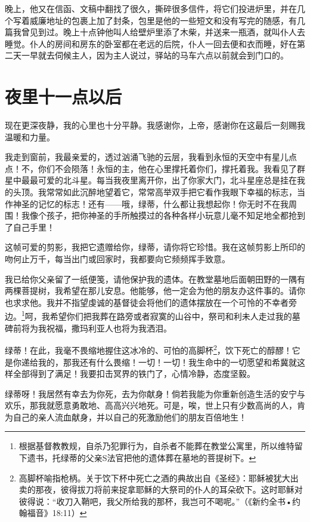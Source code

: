\documentclass[12pt,oneside]{book}
\begin{document}
\begin{framed}
晚上，他又在信函、文稿中翻找了很久，撕碎很多信件，将它们投进炉里，并在几个写着威廉地址的包裹上加了封条，包里是他的一些短文和没有写完的随感，有几篇我曾见到过。晚上十点钟他叫人给壁炉里添了木柴，并送来一瓶酒，就叫仆人去睡觉。仆人的房间和房东的卧室都在老远的后院，仆人一回去便和衣而睡，好在第二天一早就去伺候主人，因为主人说过，驿站的马车六点以前就会到门口的。
\end{framed}

\chapter{夜里十一点以后}
现在更深夜静，我的心里也十分平静。我感谢你，上帝，感谢你在这最后一刻赐我温暖和力量。

我走到窗前，我最亲爱的，透过汹涌飞驰的云层，我看到永恒的天空中有星儿点点！不，你们不会陨落！永恒的主，他在心里撑托着你们，撑托着我。我看见了群星中最最可爱的北斗星。每当我夜里离开你，出了你家大门，北斗星座总是挂在我的头顶。我常常如此沉醉地望着它，常常高举双手把它看作我眼下幸福的标志，当作神圣的记忆的标志！还有——哦，绿蒂，什么都让我想起你！你无时不在我周围！我像个孩子，把你神圣的手所触摸过的各种各样小玩意儿毫不知足地全都抢到了自己手里！

这帧可爱的剪影，我把它遗赠给你，绿蒂，请你将它珍惜。我在这帧剪影上所印的吻何止万千，每当出门或回家时，我都要向它频频挥手致意。

我已给你父亲留了一纸便笺，请他保护我的遗体。在教堂墓地后面朝田野的一隅有两棵菩提树，我希望在那儿安息。他能够，他一定会为他的朋友办这件事的。请你也求求他。我并不指望虔诚的基督徒会将他们的遗体摆放在一个可怜的不幸者旁边。\footnote{根据基督教教规，自杀乃犯罪行为，自杀者不能葬在教堂公寓里，所以维特留下遗书，托绿蒂的父亲S法官把他的遗体葬在墓地的菩提树下。}呵，我希望你们把我葬在路旁或者寂寞的山谷中，祭司和利未人走过我的墓碑前将为我祝福，撒玛利亚人也将为我洒泪。

绿蒂！在此，我毫不畏缩地握住这冰冷的、可怕的高脚杯\footnote{高脚杯喻指枪柄。关于饮下杯中死亡之酒的典故出自《圣经》：耶稣被犹大出卖的那夜，彼得拔刀将前来捉拿耶稣的大祭司的仆人的耳朵砍下。这时耶稣对彼得说：“收刀入鞘吧，我父所给我的那杯，我岂可不喝呢。”（《新约全书•约翰福音》18:11）}，饮下死亡的醇醪！它是你递给我的，那我还有什么畏缩！一切！一切！我生命中的一切愿望和希冀就这样全部得到了满足！我要扣击冥界的铁门了，心情冷静，态度坚毅。

绿蒂呀！我居然有幸去为你死，去为你献身！倘若我能为你重新创造生活的安宁与欢乐，那我就愿意勇敢地、高高兴兴地死。可是，唉，世上只有少数高尚的人，肯为自己的亲人流血献身，并以自己的死激励他们的朋友百倍地生！
\end{document}
